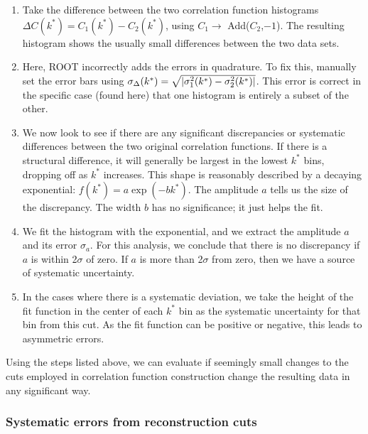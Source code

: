 \begin{enumerate}
\item Take the difference between the two correlation function histograms $\Delta C(k^*) = C_1(k^*) - C_2(k^*)$, using $C_1\rightarrow$ Add($C_2$,$-1$).  
The resulting histogram shows the usually small differences between the two data sets.
\item Here, ROOT incorrectly adds the errors in quadrature.  
To fix this, manually set the error bars using $\sigma_{\Delta}(k^*) = \sqrt{ \left\lvert \sigma_1^2(k^*) - \sigma_2^2(k^*) \right\rvert}$.  
This error is correct in the specific case (found here) that one histogram is entirely a subset of the other.
\item We now look to see if there are any significant discrepancies or systematic differences between the two original correlation functions.
If there is a structural difference, it will generally be largest in the lowest $k^*$ bins, dropping off as $k^*$ increases.
This shape is reasonably described by a decaying exponential: $f(k^*) = a \exp(-b k^*)$. 
The amplitude $a$ tells us the size of the discrepancy. The width $b$ has no significance; it just helps the fit.
\item We fit the histogram with the exponential, and we extract the amplitude $a$ and its error $\sigma_a$.
For this analysis, we conclude that there is no discrepancy if $a$ is within 2$\sigma$ of zero.
If $a$ is more than 2$\sigma$ from zero, then we have a source of systematic uncertainty.
\item In the cases where there is a systematic deviation, we take the height of the fit function in the center of each $k^*$ bin as the systematic uncertainty for that bin from this cut.
As the fit function can be positive or negative, this leads to asymmetric errors.

\end{enumerate}

Using the steps listed above, we can evaluate if seemingly small changes to the cuts employed in correlation function construction change the resulting data in any significant way.  


\subsubsection{Systematic errors from reconstruction cuts}
\label{sec:SystematicsReconstruction}

